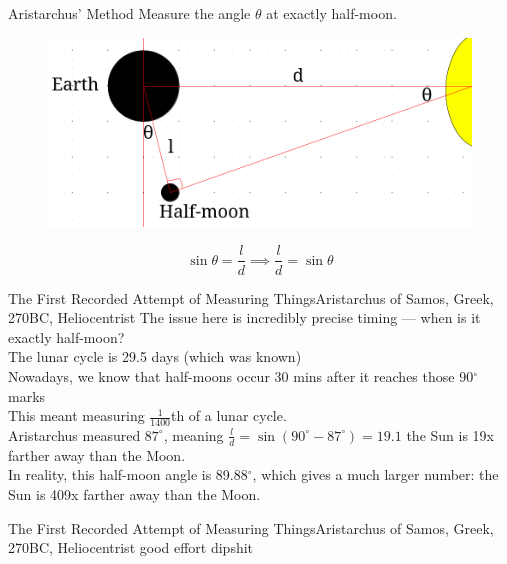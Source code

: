 \documentclass[12pt]{beamer}
\begin{document}
        \begin{frame}{Aristarchus' Method} \centering
            Measure the angle $\theta$ at exactly half-moon.
            \begin{figure}
                \includegraphics[scale=0.3, frame]{aristocrates.png}
            \end{figure}
            \[\sin{\theta}=\frac{l}{d} \implies \frac{l}{d}=\sin{\theta}\]
        \end{frame}
        \begin{frame}{The First Recorded Attempt of Measuring Things}{Aristarchus of Samos, Greek, 270BC, Heliocentrist}
            The issue here is incredibly precise timing --- when is it exactly half-moon?\\ \vspace{1em}
            \pause
            The lunar cycle is 29.5 days (which was known)\\
            Nowadays, we know that half-moons occur 30 mins after it reaches those 90$^\circ$ marks\\
            This meant measuring $\frac{1}{1400}$th of a lunar cycle.\\
            \vspace{1em}
            \pause
            Aristarchus measured $87^\circ$, meaning $\frac{l}{d}=\sin{(90^\circ-87^\circ)}=19.1$ the Sun is 19x farther away than the Moon.\\
            In reality, this half-moon angle is 89.88$^\circ$, which gives a much larger number: the Sun is 409x farther away than the Moon.
        \end{frame}
        \begin{frame}{The First Recorded Attempt of Measuring Things}{Aristarchus of Samos, Greek, 270BC, Heliocentrist} \centering
            good effort dipshit
        \end{frame}
\end{document}
